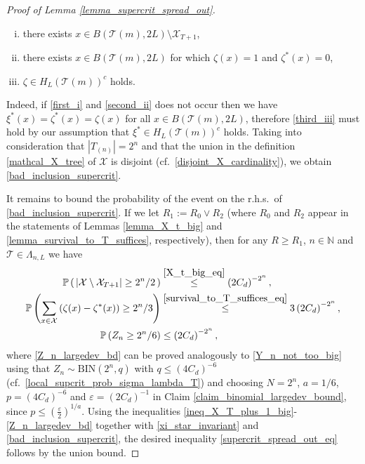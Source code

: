 \documentclass[a4paper,12pt]{article}
\begin{document}
\begin{proof}[Proof of Lemma \ref{lemma_supercrit_spread_out}]
\begin{enumerate}[(i)]
\item \label{first_i} there exists  $x \in B(\mathcal{T}(m),2L) \setminus \mathcal{X}_{T+1}$,
\item \label{second_ii} there exists
$x \in B(\mathcal{T}(m),2L)$ for which $\zeta(x)=1$ and $\zeta^*(x)=0$,
\item \label{third_iii} $ \zeta \in H_L( \mathcal{T}(m) )^c $  holds.
\end{enumerate}
Indeed, if \eqref{first_i} and \eqref{second_ii} does not occur then we have $\xi^*(x)=\zeta^*(x)=\zeta(x)$ for all $x \in B(\mathcal{T}(m),2L)$, therefore
 \eqref{third_iii} must hold by our assumption that $ \xi^* \in H_L( \mathcal{T}(m) )^c $ holds.
 Taking into consideration that $|T_{(n)}|=2^n$
and that the union in the definition \eqref{mathcal_X_tree} of $\mathcal{X}$ is disjoint (cf.\ \eqref{disjoint_X_cardinality}),
we obtain \eqref{bad_inclusion_supercrit}.

\smallskip

It remains to bound the probability of the event on the r.h.s.\ of \eqref{bad_inclusion_supercrit}.
If we let $R_1:=R_0 \vee R_2$ (where $R_0$ and $R_2$ appear in the statements of Lemmas \ref{lemma_X_t_big} and \ref{lemma_survival_to_T_suffices}, respectively), then
for
any $R \geq R_1$, $n \in \mathbb{N}$ and  $\mathcal{T} \in \Lambda_{n,L}$ we have
\begin{align}
\label{ineq_X_T_plus_1_big}
\mathbb{P}\left(\, |\mathcal{X} \setminus \mathcal{X}_{T+1}| \geq  2^n /2 \, \right) & \stackrel{ \eqref{X_t_big_eq} }{\leq} \left( 2 C_d  \right)^{-2^n}, \\
\label{ineq_zeta_and_zeta_star_do_not_differ_that_much}
 \mathbb{P}\left( \sum_{x \in \mathcal{X} } \left( \zeta(x) - \zeta^{*}(x) \right) \geq  2^n /3 \right) & \stackrel{ \eqref{survival_to_T_suffices_eq} }{\leq} 3 \left( 2 C_d  \right)^{-2^n}, \\
\label{Z_n_largedev_bd}
\mathbb{P}\left( Z_n \geq  2^n /6 \right) & \leq \left( 2 C_d  \right)^{-2^n},
\end{align}
where \eqref{Z_n_largedev_bd} can be proved analogously to \eqref{Y_n_not_too_big} using that $Z_n \sim \mathrm{BIN}(2^n,q)$ with
$q \leq (4 C_d)^{-6}$ (cf.\ \eqref{local_supcrit_prob_sigma_lambda_T}) and choosing $N=2^n$, $a=1/6$, $p=(4 C_d)^{-6}$ and $\varepsilon=(2C_d)^{-1}$ in  Claim \ref{claim_binomial_largedev_bound}, since $p \leq \left( \frac{\varepsilon}{2} \right)^{1/a}$.
 Using the inequalities \eqref{ineq_X_T_plus_1_big}-\eqref{Z_n_largedev_bd} together with
\eqref{xi_star_invariant} and \eqref{bad_inclusion_supercrit}, the desired inequality \eqref{supercrit_spread_out_eq} follows by the union bound.
\end{proof}
\end{document}
